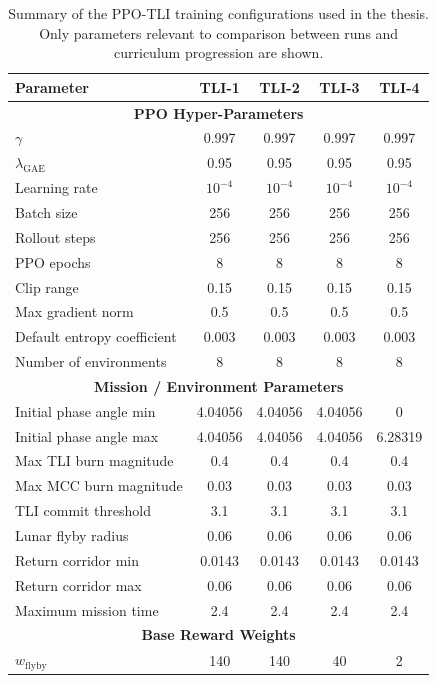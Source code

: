 \begin{table}[!t]
\centering
\caption{Summary of the PPO-TLI training configurations used in the thesis. Only parameters relevant to comparison between runs and curriculum progression are shown.}
\label{tab:ppoa_all_configs}
\renewcommand{\arraystretch}{1.1}
\scriptsize
\begin{tabular*}{\textwidth}{@{\extracolsep{\fill}}lcccc}
\toprule
\textbf{Parameter} & \textbf{TLI-1} & \textbf{TLI-2} & \textbf{TLI-3} & \textbf{TLI-4}\\
\midrule
\multicolumn{5}{c}{\textbf{PPO Hyper-Parameters}}\\
\midrule
$\gamma$ & 0.997 & 0.997 & 0.997 & 0.997\\
$\lambda_{\mathrm{GAE}}$ & 0.95 & 0.95 & 0.95 & 0.95\\
Learning rate & $10^{-4}$ & $10^{-4}$ & $10^{-4}$ & $10^{-4}$\\
Batch size & 256 & 256 & 256 & 256\\
Rollout steps & 256 & 256 & 256 & 256\\
PPO epochs & 8 & 8 & 8 & 8\\
Clip range & 0.15 & 0.15 & 0.15 & 0.15\\
Max gradient norm & 0.5 & 0.5 & 0.5 & 0.5\\
Default entropy coefficient & 0.003 & 0.003 & 0.003 & 0.003\\
Number of environments & 8 & 8 & 8 & 8\\
\midrule
\multicolumn{5}{c}{\textbf{Mission / Environment Parameters}}\\
\midrule
Initial phase angle min & 4.04056 & 4.04056 & 4.04056 & 0\\
Initial phase angle max & 4.04056 & 4.04056 & 4.04056 & 6.28319\\
Max TLI burn magnitude & 0.4 & 0.4 & 0.4 & 0.4\\
Max MCC burn magnitude & 0.03 & 0.03 & 0.03 & 0.03\\
TLI commit threshold & 3.1 & 3.1 & 3.1 & 3.1\\
Lunar flyby radius & 0.06 & 0.06 & 0.06 & 0.06\\
Return corridor min & 0.0143 & 0.0143 & 0.0143 & 0.0143\\
Return corridor max & 0.06 & 0.06 & 0.06 & 0.06\\
Maximum mission time & 2.4 & 2.4 & 2.4 & 2.4\\
\midrule
\multicolumn{5}{c}{\textbf{Base Reward Weights}}\\
\midrule
$w_{\mathrm{flyby}}$ & 140 & 140 & 40 & 2\\

\end{tabular*}
\end{table}
